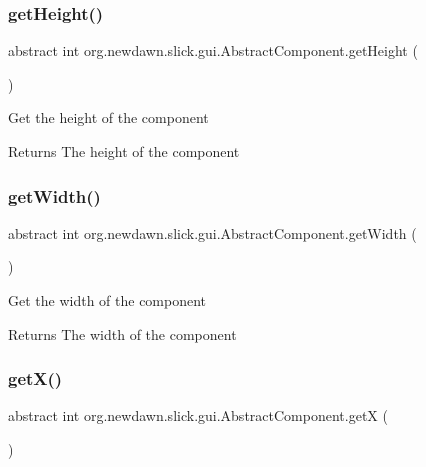 \subsubsection{\texorpdfstring{get\+Height()}{getHeight()}}
{\footnotesize\ttfamily abstract int org.\+newdawn.\+slick.\+gui.\+Abstract\+Component.\+get\+Height (\begin{DoxyParamCaption}{ }\end{DoxyParamCaption})\hspace{0.3cm}{\ttfamily [abstract]}}

Get the height of the component

\begin{DoxyReturn}{Returns}
The height of the component 
\end{DoxyReturn}
\mbox{\label{classorg_1_1newdawn_1_1slick_1_1gui_1_1_abstract_component_ab09e022b383b64e6b82dd03525a7efc9}} 
\subsubsection{\texorpdfstring{get\+Width()}{getWidth()}}
{\footnotesize\ttfamily abstract int org.\+newdawn.\+slick.\+gui.\+Abstract\+Component.\+get\+Width (\begin{DoxyParamCaption}{ }\end{DoxyParamCaption})\hspace{0.3cm}{\ttfamily [abstract]}}

Get the width of the component

\begin{DoxyReturn}{Returns}
The width of the component 
\end{DoxyReturn}
\mbox{\label{classorg_1_1newdawn_1_1slick_1_1gui_1_1_abstract_component_a9b0ebb0eb32e92db4475960bb5ceec19}} 
\subsubsection{\texorpdfstring{get\+X()}{getX()}}
{\footnotesize\ttfamily abstract int org.\+newdawn.\+slick.\+gui.\+Abstract\+Component.\+getX (\begin{DoxyParamCaption}{ }\end{DoxyParamCaption})\hspace{0.3cm}{\ttfamily [abstract]}}


